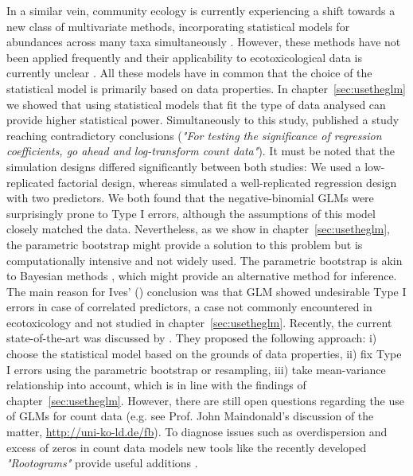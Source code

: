 In a similar vein, community ecology is currently experiencing a shift towards a new class of multivariate methods, incorporating statistical models for abundances across many taxa simultaneously \citep{warton_model-based_2015, warton_distance-based_2012, warton_so_2015, ter_braak_topics_2014}.
However, these methods have not been applied frequently and their applicability to ecotoxicological data is currently unclear \citep{szocs_analysing_2015}. 
All these models have in common that the choice of the statistical model is primarily based on data properties. 
In chapter~\ref{sec:usetheglm} we showed that using statistical models that fit the type of data analysed can provide higher statistical power.
Simultaneously to this study, \citet{ives_for_2015} published a study reaching contradictory conclusions (\emph{"For testing the significance of regression coefficients, go ahead and log-transform count data"}). 
It must be noted that the simulation designs differed significantly between both studies: We used a low-replicated factorial design, whereas \citet{ives_for_2015} simulated a well-replicated regression design with two predictors.
We both found that the negative-binomial GLMs were surprisingly prone to Type I errors, although the assumptions of this model closely matched the data.
Nevertheless, as we show in chapter~\ref{sec:usetheglm}, the parametric bootstrap might provide a solution to this problem but is computationally intensive and not widely used.
The parametric bootstrap is akin to Bayesian methods \citep{gelman_bayesian_2014}, which might provide an alternative method for inference.
The main reason for Ives' (\citeyear{ives_for_2015}) conclusion was that GLM showed undesirable Type I errors in case of correlated predictors, a case not commonly encountered in ecotoxicology and not studied in chapter~\ref{sec:usetheglm}.
Recently, the current state-of-the-art was discussed by \citet{warton_three_2016}. They proposed the following approach: i) choose the statistical model based on the grounds of data properties, ii) fix Type I errors using the parametric bootstrap or resampling, iii) take mean-variance relationship into account, which is in line with the findings of chapter~\ref{sec:usetheglm}.
However, there are still open questions regarding the use of GLMs for count data (e.g. see Prof. John Maindonald's discussion of the matter, \url{http://uni-ko-ld.de/fb}).
To diagnose issues such as overdispersion and excess of zeros in count data models new tools like the recently developed \emph{"Rootograms"} provide useful additions \citep{kleiber_visualizing_2016}.

